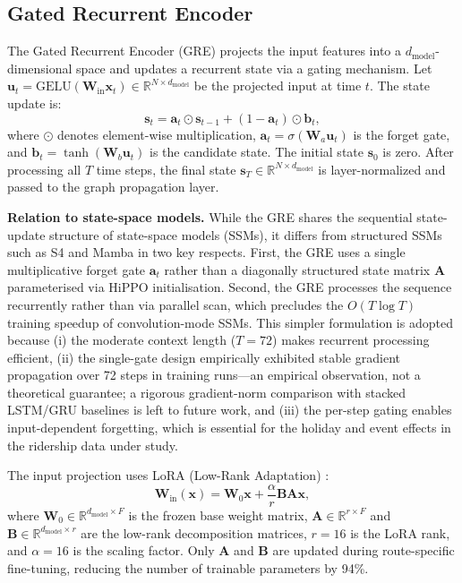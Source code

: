 \subsection{Gated Recurrent Encoder}

The Gated Recurrent Encoder (GRE) projects the input features into a $d_{\text{model}}$-dimensional space and updates a recurrent state via a gating mechanism. Let $\mathbf{u}_t = \text{GELU}(\mathbf{W}_{\text{in}} \mathbf{x}_t) \in \mathbb{R}^{N \times d_{\text{model}}}$ be the projected input at time $t$. The state update is:
\begin{equation}
    \mathbf{s}_t = \mathbf{a}_t \odot \mathbf{s}_{t-1} + (1 - \mathbf{a}_t) \odot \mathbf{b}_t,
    \label{eq:ssm}
\end{equation}
where $\odot$ denotes element-wise multiplication, $\mathbf{a}_t = \sigma(\mathbf{W}_a \mathbf{u}_t)$ is the forget gate, and $\mathbf{b}_t = \tanh(\mathbf{W}_b \mathbf{u}_t)$ is the candidate state. The initial state $\mathbf{s}_0$ is zero. After processing all $T$ time steps, the final state $\mathbf{s}_T \in \mathbb{R}^{N \times d_{\text{model}}}$ is layer-normalized and passed to the graph propagation layer.

\textbf{Relation to state-space models.} While the GRE shares the sequential state-update structure of state-space models (SSMs), it differs from structured SSMs such as S4 \cite{gu2022efficiently} and Mamba \cite{gu2023mamba} in two key respects. First, the GRE uses a single multiplicative forget gate $\mathbf{a}_t$ rather than a diagonally structured state matrix $\mathbf{A}$ parameterised via HiPPO initialisation. Second, the GRE processes the sequence recurrently rather than via parallel scan, which precludes the $O(T \log T)$ training speedup of convolution-mode SSMs. This simpler formulation is adopted because (i) the moderate context length ($T = 72$) makes recurrent processing efficient, (ii) the single-gate design empirically exhibited stable gradient propagation over 72 steps in training runs---an empirical observation, not a theoretical guarantee; a rigorous gradient-norm comparison with stacked LSTM/GRU baselines is left to future work, and (iii) the per-step gating enables input-dependent forgetting, which is essential for the holiday and event effects in the ridership data under study.

The input projection uses LoRA (Low-Rank Adaptation) \cite{hu2022lora}:
\begin{equation}
    \mathbf{W}_{\text{in}}(\mathbf{x}) = \mathbf{W}_0 \mathbf{x} + \frac{\alpha}{r} \mathbf{B} \mathbf{A} \mathbf{x},
    \label{eq:lora}
\end{equation}
where $\mathbf{W}_0 \in \mathbb{R}^{d_{\text{model}} \times F}$ is the frozen base weight matrix, $\mathbf{A} \in \mathbb{R}^{r \times F}$ and $\mathbf{B} \in \mathbb{R}^{d_{\text{model}} \times r}$ are the low-rank decomposition matrices, $r = 16$ is the LoRA rank, and $\alpha = 16$ is the scaling factor. Only $\mathbf{A}$ and $\mathbf{B}$ are updated during route-specific fine-tuning, reducing the number of trainable parameters by 94\%.

